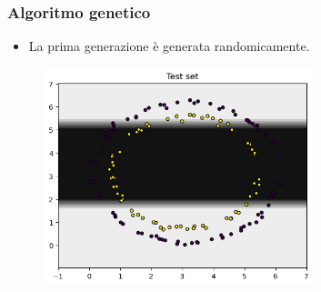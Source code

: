\documentclass{beamer}
\begin{document}
\begin{frame}
  \frametitle{Algoritmo genetico}
  \begin{itemize}
    \item La prima generazione è generata randomicamente. 
  \end{itemize}

  \begin{figure}
    \includegraphics[width=0.7\textwidth]{images/badresult.png}
  \end{figure} 
\end{frame}
\end{document}
